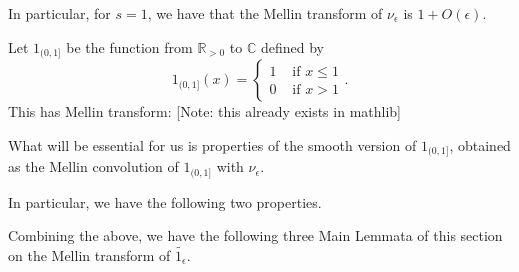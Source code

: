 {

In particular, for $s=1$, we have that the Mellin transform of $\nu_\epsilon$ is $1+O(\epsilon)$.



Let $1_{(0,1]}$ be the function from $\mathbb{R}_{>0}$ to $\mathbb{C}$ defined by
$$1_{(0,1]}(x) = \begin{cases}
1 & \text{ if }x\leq 1\\
0 & \text{ if }x>1
\end{cases}.$$
This has Mellin transform:
[Note: this already exists in mathlib]


What will be essential for us is properties of the smooth version of $1_{(0,1]}$, obtained as the
 Mellin convolution of $1_{(0,1]}$ with $\nu_\epsilon$.


In particular, we have the following two properties.





Combining the above, we have the following three Main Lemmata of this section on the Mellin
transform of $\widetilde{1_{\epsilon}}$.




}